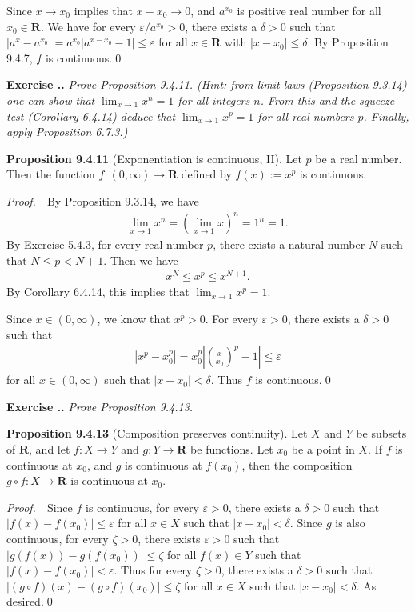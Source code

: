 \documentclass{book}
\newcommand{\pff}{\vspace{.25em}\noindent\emph{Proof.}~~}
\newcommand{\titl}[1]{\noindent\textbf{#1}}
\newcounter{Exercise}[section]
\renewcommand{\theExercise}{\thesection.\arabic{Exercise}.}
\newcommand{\new}{\vspace{1.5em}\noindent\textbf{{Exercise \stepcounter{Exercise}\textbf{\theExercise}}} }
\begin{document}
Since $x\to x_0$ implies that $x-x_0\to 0$, and $a^{x_0}$ is positive real number for all $x_0\in\mathbf{R}$. We have for every $\varepsilon/a^{x_0}>0$, there exists a $\delta>0$ such that $|a^x-a^{x_0}|=a^{x_0}|a^{x-x_0}-1|\leq\varepsilon$ for all $x\in\mathbf{R}$ with $|x-x_0|\leq\delta$. By Proposition 9.4.7, $f$ is continuous.\qed

\new\emph{Prove Proposition 9.4.11. (Hint: from limit laws (Proposition 9.3.14) one can show that $\lim_{x\to 1}x^n=1$ for all integers $n$. From this and the squeeze test (Corollary 6.4.14) deduce that $\lim_{x\to 1}x^p=1$ for all real numbers $p$. Finally, apply Proposition 6.7.3.)}

\begin{framed}
\titl{Proposition 9.4.11} (Exponentiation is continuous, II). Let $p$ be a real number. Then the function $f:(0,\infty)\to\mathbf{R}$ defined by $f(x):=x^p$ is continuous.
\end{framed}

\pff By Proposition 9.3.14, we have
    \begin{align*}
        \lim_{x\to 1}x^n=\left(\lim_{x\to 1}x\right)^n=1^n=1.
    \end{align*}
By Exercise 5.4.3, for every real number $p$, there exists a natural number $N$ such that $N\leq p<N+1$. Then we have
    \begin{align*}
        x^N\leq x^p\leq x^{N+1}.
    \end{align*}
By Corollary 6.4.14, this implies that $\lim_{x\to 1}x^p=1$.

Since $x\in(0,\infty)$, we know that $x^p>0$. For every $\varepsilon>0$, there exists a $\delta>0$ such that
    \begin{align*}
        |x^p-x_0^p|=x_0^p\left|\left(\frac{x}{x_0}\right)^p-1\right|\leq\varepsilon
    \end{align*}
for all $x\in(0,\infty)$ such that $|x-x_0|<\delta$. Thus $f$ is continuous.\qed

\new\emph{Prove Proposition 9.4.13.}

\begin{framed}
\titl{Proposition 9.4.13} (Composition preserves continuity). Let $X$ and $Y$ be subsets of $\mathbf{R}$, and let $f:X\to Y$ and $g:Y\to\mathbf{R}$ be functions. Let $x_0$ be a point in $X$. If $f$ is continuous at $x_0$, and $g$ is continuous at $f(x_0)$, then the composition $g\circ f:X\to\mathbf{R}$ is continuous at $x_0$.
\end{framed}

\pff Since $f$ is continuous, for every $\varepsilon>0$, there exists a $\delta>0$ such that $|f(x)-f(x_0)|\leq\varepsilon$ for all $x\in X$ such that $|x-x_0|<\delta$. Since $g$ is also continuous, for every $\zeta>0$, there exists $\varepsilon>0$ such that $|g(f(x))-g(f(x_0))|\leq\zeta$ for all $f(x)\in Y$ such that $|f(x)-f(x_0)|<\varepsilon$. Thus for every $\zeta>0$, there exists a $\delta>0$ such that $|(g\circ f)(x)-(g\circ f)(x_0)|\leq\zeta$ for all $x\in X$ such that $|x-x_0|<\delta$. As desired.\qed
\end{document}
